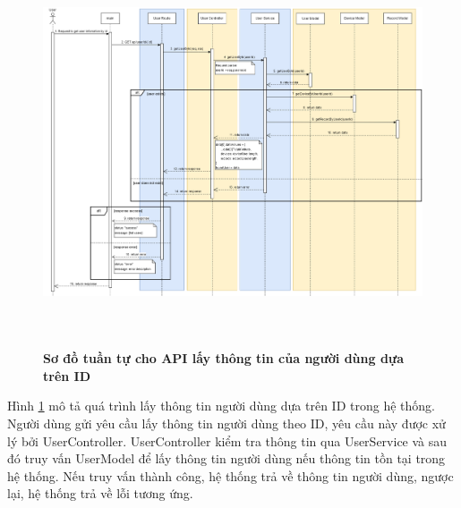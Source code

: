 \begin{figure}[H]
  \centering
  \includegraphics[width=16cm,height=11.5cm]{Images/sequence_api/getUserById.png}
  \caption[Sơ đồ tuần tự cho API lấy thông tin của người dùng dựa trên ID ]{\bfseries \fontsize{12pt}{0pt}
  \selectfont Sơ đồ tuần tự cho API lấy thông tin của người dùng dựa trên ID }
  \label{api_getUserById} %
\end{figure}
Hình \ref{api_getUserById} mô tả quá trình lấy thông tin người dùng dựa trên ID trong hệ thống. Người dùng gửi yêu cầu lấy thông tin người dùng theo ID, yêu cầu này được xử lý bởi UserController. UserController kiểm tra thông tin qua UserService và sau đó truy vấn UserModel để lấy thông tin người dùng nếu 
thông tin tồn tại trong hệ thống. Nếu truy vấn thành công, hệ thống trả về thông tin người dùng, ngược lại, hệ thống trả về lỗi tương ứng.

